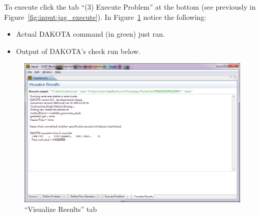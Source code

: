 To execute click the tab ``(3) Execute Problem'' at the bottom (see previously in Figure~\ref{fig:input:jag_execute}). 
In Figure~\ref{fig:input:5Visualize} notice the following:
\begin{itemize}
\item Actual DAKOTA command (in green) just ran.
\item Output of DAKOTA's check run below.
\end{itemize}
\begin{figure}[htbp]
  \centering
  \includegraphics[scale=0.6]{images/5Visualize}
  \caption{``Visualize Results'' tab}
  \label{fig:input:5Visualize}
\end{figure}


